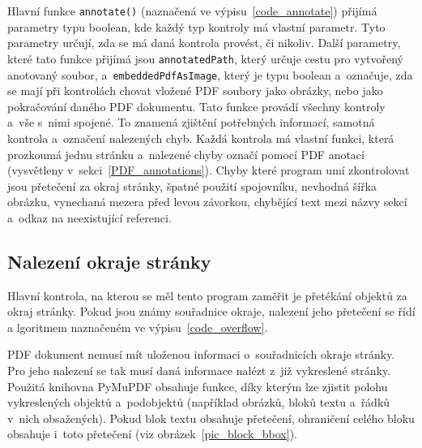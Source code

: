 Hlavní funkce \texttt{annotate()} (naznačená ve výpisu~\ref{code_annotate}) přijímá parametry typu boolean, kde
každý typ kontroly má vlastní parametr. Tyto parametry určují, zda se má daná
kontrola provést, či nikoliv. Další parametry, které tato funkce přijímá jsou
\texttt{annotatedPath}, který určuje cestu pro vytvořený anotovaný soubor,
a~\texttt{embeddedPdfAsImage}, který je typu boolean a~označuje, zda se mají
při kontrolách chovat vložené PDF soubory jako obrázky, nebo jako pokračování
daného PDF dokumentu. Tato funkce provádí všechny kontroly a~vše s~nimi spojené.
To znamená zjištění potřebných informací, samotná kontrola a~označení nalezených
chyb. Každá kontrola má vlastní funkci, která prozkoumá jednu stránku a~nalezené
chyby označí pomocí PDF anotací (vysvětleny v~sekci~\ref{PDF_annotations}).
Chyby které program umí zkontrolovat jsou přetečení za okraj stránky, 
špatné použití spojovníku, nevhodná šířka obrázku, vynechaná mezera před levou
závorkou, chybějící text mezi názvy sekcí a~odkaz na neexistující referenci.

\noindent\begin{minipage}{\linewidth}
    \hfill
    
\end{minipage}


\subsection*{Nalezení okraje stránky}
Hlavní kontrola, na kterou se měl tento program zaměřit je přetékání objektů za
okraj stránky. Pokud jsou známy souřadnice okraje, nalezení jeho přetečení
se řídí a
lgoritmem naznačeném ve výpisu~\ref{code_overflow}.

\noindent\begin{minipage}{\linewidth}
    \hfill
    
\end{minipage}

PDF dokument nemusí mít uloženou informaci o~souřadnicích okraje stránky. Pro
jeho nalezení se tak musí daná informace nalézt z~již vykreslené stránky.
Použitá knihovna PyMuPDF obsahuje funkce, díky kterým lze zjistit polohu
vykreslených objektů a~podobjektů (například obrázků, bloků textu a~řádků v~nich
obsažených). Pokud blok textu obsahuje přetečení, ohraničení celého bloku
obsahuje i~toto přetečení (viz obrázek~\ref{pic_block_bbox}).

